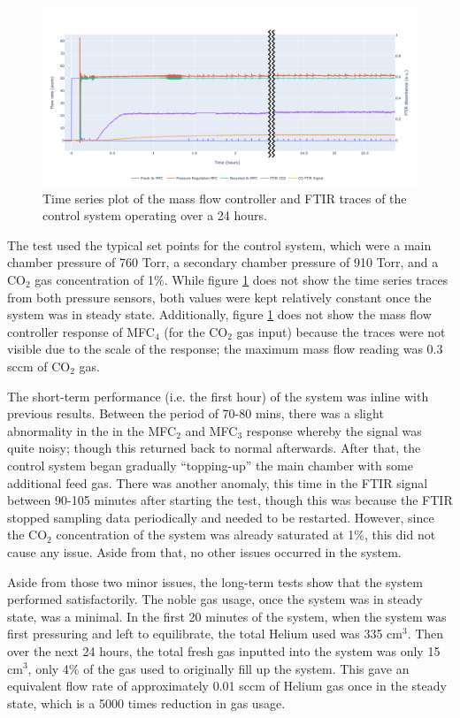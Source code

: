 \begin{figure}[h!]
	\centering
	\includegraphics[width=\linewidth]{chapter_5/figures/24_hour_test_run.png}
	\caption{Time series plot of the mass flow controller and FTIR traces of the control system operating over a 24 hours.}
	\label{fig:24_hour_test_run}
\end{figure}

The test used the typical set points for the control system, which were a main chamber pressure of 760 Torr,  a secondary chamber pressure of 910 Torr, and a CO$_2$ gas concentration of 1\%. While figure \ref{fig:24_hour_test_run} does not show the time series traces from both pressure sensors, both values were kept relatively constant once the system was in steady state. Additionally, figure \ref{fig:24_hour_test_run} does not show the mass flow controller response of MFC$_4$ (for the CO$_2$ gas input) because the traces were not visible due to the scale of the response; the maximum mass flow reading was 0.3 sccm of CO$_2$ gas. 

The short-term performance (i.e. the first hour) of the system was inline with previous results. Between the period of 70-80 mins, there was a slight abnormality in the in the MFC$_2$ and MFC$_3$ response whereby the signal was quite noisy; though this returned back to normal afterwards. After that, the control system began gradually ``topping-up'' the main chamber with some additional feed gas. There was another anomaly, this time in the FTIR signal between 90-105 minutes after starting the test, though this was because the FTIR stopped sampling data periodically and needed to be restarted. However, since the CO$_2$ concentration of the system was already saturated at 1\%, this did not cause any issue. Aside from that, no other issues occurred in the system.

Aside from those two minor issues, the long-term tests show that the system performed satisfactorily. The noble gas usage, once the system was in steady state, was a minimal. In the first 20 minutes of the system, when the system was first pressuring and left to equilibrate, the total Helium used was 335 cm$^3$. Then over the next 24 hours, the total fresh gas inputted into the system was only 15 cm$^3$, only 4\% of the gas used to originally fill up the system. This gave an equivalent flow rate of approximately 0.01 sccm of Helium gas once in the steady state, which is a 5000 times reduction in gas usage. 


